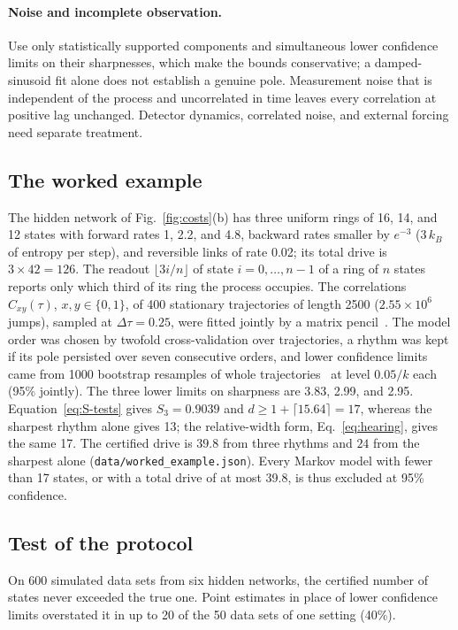 \paragraph*{Noise and incomplete observation.} Use only statistically supported components and simultaneous lower confidence limits on their sharpnesses, which make the bounds conservative; a damped-sinusoid fit alone does not establish a genuine pole. Measurement noise that is independent of the process and uncorrelated in time leaves every correlation at positive lag unchanged. Detector dynamics, correlated noise, and external forcing need separate treatment.

\subsection{The worked example}

The hidden network of Fig.~\ref{fig:costs}(b) has three uniform rings of 16, 14, and 12 states with forward rates 1, 2.2, and 4.8, backward rates smaller by $e^{-3}$ ($3\,k_B$ of entropy per step), and reversible links of rate 0.02; its total drive is $3\times42=126$. The readout $\lfloor3i/n\rfloor$ of state $i=0,\dots,n-1$ of a ring of $n$ states reports only which third of its ring the process occupies. The correlations $C_{xy}(\tau)$, $x,y\in\{0,1\}$, of 400 stationary trajectories of length 2500 ($2.55\times10^6$ jumps), sampled at $\Delta\tau=0.25$, were fitted jointly by a matrix pencil~\cite{hua1990}. The model order was chosen by twofold cross-validation over trajectories, a rhythm was kept if its pole persisted over seven consecutive orders, and lower confidence limits came from 1000 bootstrap resamples of whole trajectories~\cite{efron1979} at level $0.05/k$ each (95\% jointly). The three lower limits on sharpness are 3.83, 2.99, and 2.95. Equation~\eqref{eq:S-tests} gives $S_3=0.9039$ and $d\ge1+\lceil15.64\rceil=17$, whereas the sharpest rhythm alone gives 13; the relative-width form, Eq.~\eqref{eq:hearing}, gives the same 17. The certified drive is $39.8$ from three rhythms and $24$ from the sharpest alone (\texttt{data/worked\_example.json}). Every Markov model with fewer than 17 states, or with a total drive of at most 39.8, is thus excluded at 95\% confidence.

\subsection{Test of the protocol}\label{sec:protocol}

On 600 simulated data sets from six hidden networks, the certified number of states never exceeded the true one. Point estimates in place of lower confidence limits overstated it in up to 20 of the 50 data sets of one setting (40\%).

